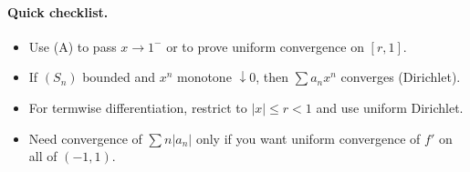 \documentclass[12pt,a4paper]{article}
\theoremstyle{plain}
\theoremstyle{definition}
\theoremstyle{remark}
\theoremstyle{remark}
\begin{document}
\paragraph{Quick checklist.}
\begin{itemize}
	\item Use (A) to pass $x\to 1^-$ or to prove uniform convergence on $[r,1]$.
	\item If $(S_n)$ bounded and $x^n$ monotone $\downarrow 0$, then $\sum a_n x^n$ converges (Dirichlet).
	\item For termwise differentiation, restrict to $|x|\le r<1$ and use uniform Dirichlet.
	\item Need convergence of $\sum n|a_n|$ only if you want uniform convergence of $f'$ on all of $(-1,1)$.
\end{itemize}

\end{document}
